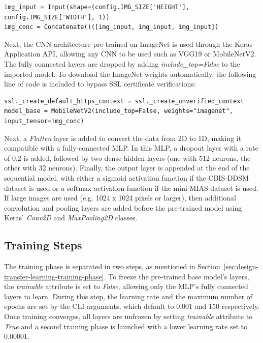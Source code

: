 \begin{lstlisting}[numbers=none]
img_input = Input(shape=(config.IMG_SIZE['HEIGHT'], config.IMG_SIZE['WIDTH'], 1))
img_conc = Concatenate()([img_input, img_input, img_input])
\end{lstlisting}

Next, the CNN architecture pre-trained on ImageNet is used through the Keras Application API, allowing any CNN to be used such as VGG19 or MobileNetV2. The fully connected layers are dropped by adding \textit{include\_top=False} to the imported model. To download the ImageNet weights automatically, the following line of code is included to bypass SSL certificate verifications:

\begin{lstlisting}[numbers=none]
ssl._create_default_https_context = ssl._create_unverified_context
model_base = MobileNetV2(include_top=False, weights="imagenet", input_tensor=img_conc)
\end{lstlisting}

Next, a \textit{Flatten} layer is added to convert the data from 2D to 1D, making it compatible with a fully-connected MLP. In this MLP, a dropout layer with a rate of 0.2 is added, followed by two dense hidden layers (one with 512 neurons, the other with 32 neurons). Finally, the output layer is appended at the end of the sequential model, with either a sigmoid activation function if the CBIS-DDSM dataset is used or a softmax activation function if the mini-MIAS dataset is used. If large images are used (e.g. 1024 x 1024 pixels or larger), then additional convolution and pooling layers are added before the pre-trained model using Keras' \textit{Conv2D} and \textit{MaxPooling2D} classes.

\subsection{Training Steps} 

The training phase is separated in two steps, as mentioned in Section~\ref{sec:design-transfer-learning-training-phase}. To freeze the pre-trained base model's layers, the \textit{trainable} attribute is set to \textit{False}, allowing only the MLP's fully connected layers to learn. During this step, the learning rate and the maximum number of epochs are set by the CLI arguments, which default to $0.001$ and $150$ respectively. Once training converges, all layers are unfrozen by setting \textit{trainable} attribute to \textit{True} and a second training phase is launched with a lower learning rate set to $0.00001$.\\

